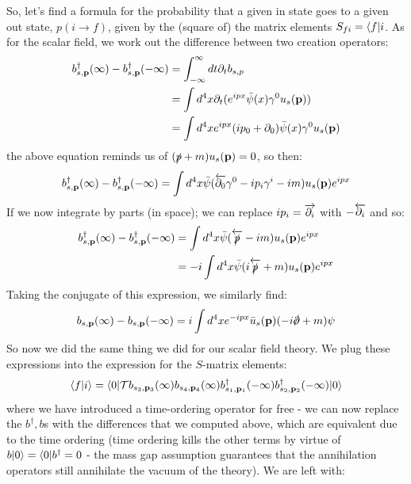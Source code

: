 So, let's find a formula for the probability that a given in state goes to a given out state, $p(i\to f)$, given by the (square of) the matrix elements $S_{fi} = \langle f \rvert{i}$. As for the scalar field, we work out the difference between two creation operators:
\begin{equation}
    \begin{split}
        b^\dagger_{s, \mathbf{p}}(\infty) - b^\dagger_{s, \mathbf{p}}(-\infty) &= \int_{-\infty}^\infty dt \partial_t b_{s, p}
        \\ &= \int d^4x \partial_t(e^{ipx}\bar{\psi}(x)\gamma^0u_s(\mathbf{p}))
        \\ &= \int d^4x e^{ipx}(ip_0 + \partial_0)\bar{\psi}(x)\gamma^0u_s(\mathbf{p})
    \end{split}
\end{equation}
the above equation reminds us of $(\slashed{p} + m)u_s(\mathbf{p}) = 0$, so then:
\begin{equation}
    b^\dagger_{s, \mathbf{p}}(\infty) - b^\dagger_{s, \mathbf{p}}(-\infty) = \int d^4x\bar{\psi}(\overleftarrow{\partial_0} \gamma^0 - ip_i \gamma^i - im)u_s(\mathbf{p})e^{ipx}
\end{equation}
If we now integrate by parts (in space); we can replace $ip_i = \overrightarrow{\partial_i}$ with $-\overleftarrow{\partial_i}$ and so:
\begin{equation}
    \begin{split}
        b^\dagger_{s, \mathbf{p}}(\infty) - b^\dagger_{s, \mathbf{p}}(-\infty) &= \int d^4x \bar{\psi}(\overleftarrow{\slashed{p}} - im)u_s(\mathbf{p})e^{ipx}
        \\ &= -i\int d^4x \bar{\psi}(i\overleftarrow{\slashed{p}} + m)u_s(\mathbf{p})e^{ipx}
    \end{split}
\end{equation}
Taking the conjugate of this expression, we similarly find:
\begin{equation}
    b_{s, \v{p}}(\infty) - b_{s, \v{p}}(-\infty) = i\int d^4x e^{-ipx}\bar{u}_s(\v{p})(-i\slashed{\p} + m)\psi
\end{equation}
So now we did the same thing we did for our scalar field theory. We plug these expressions into the expression for the $S$-matrix elements:
\begin{equation}
    \langle f \lvert i \rangle = \langle 0 \rvert\mathcal{T}b_{s_3, \mathbf{p}_3}(\infty)b_{s_4, \mathbf{p}_4}(\infty)b^\dagger_{s_1, \mathbf{p}_1}(-\infty)b^\dagger_{s_2, \mathbf{p}_2}(-\infty)\lvert 0 \rangle
\end{equation}
where we have introduced a time-ordering operator for free - we can now replace the $b^\dag, b$s with the differences that we computed above, which are equivalent due to the time ordering (time ordering kills the other terms by virtue of $b\lvert 0 \rangle = \langle 0 \rvert b^\dagger = 0$ - the mass gap assumption guarantees that the annihilation operators still annihilate the vacuum of the theory). We are left with:

